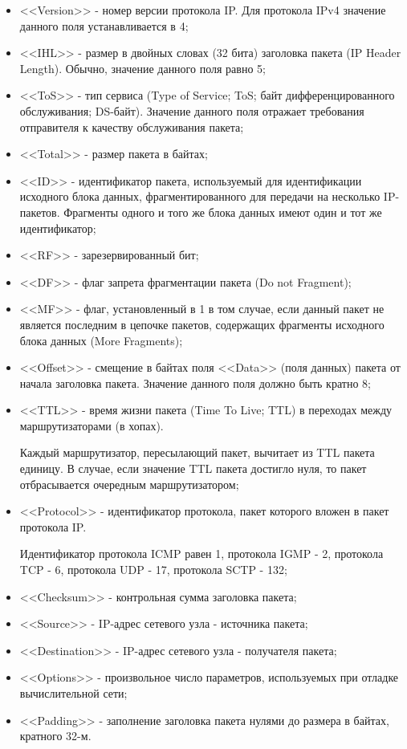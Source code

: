 	\begin{itemize}

		\item <<Version>> - номер версии протокола IP. Для протокола IPv4 значение данного поля устанавливается в 4;
		\item <<IHL>> - размер в двойных словах (32 бита) заголовка пакета (IP Header Length).
		Обычно, значение данного поля равно 5;
		\item <<ToS>> - тип сервиса (Type of Service; ToS; байт дифференцированного обслуживания; DS-байт). Значение данного поля отражает требования отправителя
		к качеству обслуживания пакета;
		\item <<Total>> - размер пакета в байтах;
		\item <<ID>> - идентификатор пакета, используемый для идентификации исходного блока данных, фрагментированного для передачи на несколько IP-пакетов.
		Фрагменты одного и того же блока данных имеют один и тот же идентификатор;
		\item <<RF>> - зарезервированный бит;
		\item <<DF>> - флаг запрета фрагментации пакета (Do not Fragment);
		\item <<MF>> - флаг, установленный в 1 в том случае, если данный пакет не является последним в цепочке пакетов, содержащих фрагменты исходного
		блока данных (More Fragments);
		\item <<Offset>> - смещение в байтах поля <<Data>> (поля данных) пакета от начала заголовка пакета. Значение данного поля должно быть кратно 8;
		\item <<TTL>> - время жизни пакета (Time To Live; TTL) в переходах между маршрутизаторами (в хопах).
		
		Каждый маршрутизатор, пересылающий пакет, вычитает из TTL пакета единицу. В случае, если значение TTL пакета достигло нуля,
		то пакет отбрасывается очередным маршрутизатором;

		\item <<Protocol>> - идентификатор протокола, пакет которого вложен в пакет протокола IP.

		Идентификатор протокола ICMP равен 1, протокола IGMP - 2, протокола TCP - 6, протокола UDP - 17, протокола SCTP - 132;

		\item <<Checksum>> - контрольная сумма заголовка пакета;
		\item <<Source>> - IP-адрес сетевого узла - источника пакета;
		\item <<Destination>> - IP-адрес сетевого узла - получателя пакета;
		\item <<Options>> - произвольное число параметров, используемых при отладке вычислительной сети;
		\item <<Padding>> - заполнение заголовка пакета нулями до размера в байтах, кратного 32-м.

	\end{itemize}

